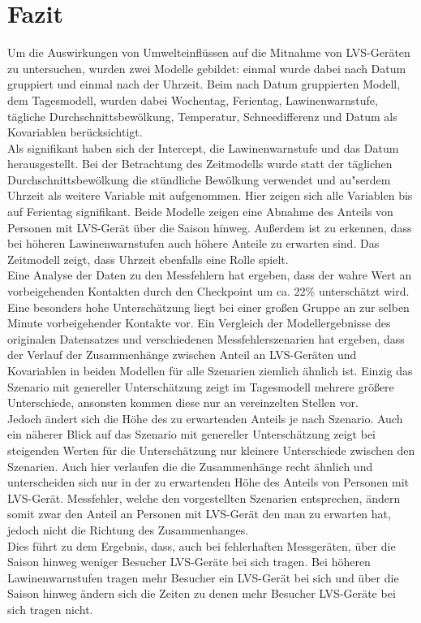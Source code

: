 \documentclass[12pt]{scrreprt}
\begin{document}
\chapter{Fazit}
Um die Auswirkungen von Umwelteinflüssen auf die Mitnahme von LVS-Geräten zu untersuchen, wurden zwei Modelle gebildet: einmal wurde dabei nach Datum gruppiert und einmal nach der Uhrzeit. Beim nach Datum gruppierten Modell, dem Tagesmodell, wurden dabei Wochentag, Ferientag, Lawinenwarnstufe, tägliche Durchschnittsbewölkung, Temperatur, Schneedifferenz  und Datum als Kovariablen berücksichtigt. \\
Als signifikant haben sich der Intercept, die Lawinenwarnstufe und das Datum herausgestellt. Bei der Betrachtung des Zeitmodells wurde statt der täglichen Durchschnittsbewölkung die stündliche Bewölkung verwendet und au"serdem Uhrzeit als weitere Variable mit aufgenommen. Hier zeigen sich alle Variablen bis auf Ferientag signifikant. Beide Modelle zeigen eine Abnahme des Anteils von Personen mit LVS-Gerät über die Saison hinweg. Außerdem ist zu erkennen, dass bei höheren Lawinenwarnstufen auch höhere Anteile zu erwarten sind. Das Zeitmodell zeigt, dass Uhrzeit ebenfalls eine Rolle spielt. \\
Eine Analyse der Daten zu den Messfehlern hat ergeben, dass der wahre Wert an vorbeigehenden Kontakten durch den Checkpoint um ca. 22\% unterschätzt wird. Eine besonders hohe Unterschätzung liegt bei einer großen Gruppe an zur selben Minute vorbeigehender Kontakte vor. Ein Vergleich der Modellergebnisse des originalen Datensatzes und verschiedenen Messfehlerszenarien hat ergeben, dass der Verlauf der Zusammenhänge zwischen Anteil an LVS-Geräten und Kovariablen in beiden Modellen für alle Szenarien ziemlich ähnlich ist. Einzig das Szenario mit genereller Unterschätzung zeigt im Tagesmodell mehrere größere Unterschiede, ansonsten kommen diese nur an vereinzelten Stellen vor. \\ Jedoch ändert sich die Höhe des zu erwartenden Anteils je nach Szenario. Auch ein näherer Blick auf das Szenario mit genereller Unterschätzung zeigt bei steigenden Werten für die Unterschätzung nur kleinere Unterschiede zwischen den Szenarien. Auch hier verlaufen die die Zusammenhänge recht ähnlich und unterscheiden sich nur in der zu erwartenden Höhe des Anteils von Personen mit LVS-Gerät. Messfehler, welche den vorgestellten Szenarien entsprechen, ändern somit zwar den Anteil an Personen mit LVS-Gerät den man zu erwarten hat, jedoch nicht die Richtung des Zusammenhanges. \\
Dies führt zu dem Ergebnis, dass, auch bei fehlerhaften Messgeräten, über die Saison hinweg weniger Besucher LVS-Geräte bei sich tragen. Bei höheren Lawinenwarnstufen tragen mehr Besucher ein LVS-Gerät bei sich und über die Saison hinweg ändern sich die Zeiten zu denen mehr Besucher LVS-Geräte bei sich tragen nicht.
\end{document}

